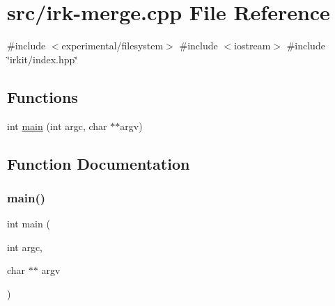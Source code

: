 \hypertarget{irk-merge_8cpp}{}\section{src/irk-\/merge.cpp File Reference}
\label{irk-merge_8cpp}
{\ttfamily \#include $<$experimental/filesystem$>$}\newline
{\ttfamily \#include $<$iostream$>$}\newline
{\ttfamily \#include \char`\"{}irkit/index.\+hpp\char`\"{}}\newline
\subsection*{Functions}
\begin{DoxyCompactItemize}
\item 
int \hyperlink{irk-merge_8cpp_a3c04138a5bfe5d72780bb7e82a18e627}{main} (int argc, char $\ast$$\ast$argv)
\end{DoxyCompactItemize}


\subsection{Function Documentation}
\mbox{\label{irk-merge_8cpp_a3c04138a5bfe5d72780bb7e82a18e627}} 
\subsubsection{\texorpdfstring{main()}{main()}}
{\footnotesize\ttfamily int main (\begin{DoxyParamCaption}\item[{int}]{argc,  }\item[{char $\ast$$\ast$}]{argv }\end{DoxyParamCaption})}

